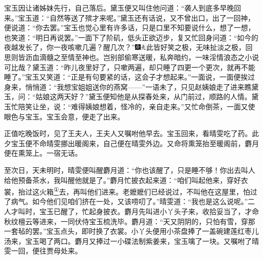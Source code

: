 宝玉因让诸姊妹先行，自己落后。黛玉便又叫住他问道：``袭人到底多早晚回来。''宝玉道：``自然等送了殡才来呢。''黛玉还有话说，又不曾出口，出了一回神，便说道：``你去罢。''宝玉也觉心里有许多话，只是口里不知要说什么，想了一想，也笑道：``明日再说罢。''一面下了阶矶，低头正欲迈步，复又忙回身问道：``如今的夜越发长了，你一夜咳嗽几遍？醒几次？''{\includegraphics[width=3mm]{../Images/00004}\includegraphics[width=3mm]{../Images/00012}\footnotesize \kaishu 此皆好笑之极，无味扯淡之极，回思则皆沥血滴髓之至情至神也。岂别部偷寒送暖，私奔暗约，一味淫情浪态之小说可比哉？}黛玉道：``昨儿夜里好了，只嗽两遍，却只睡了四更一个更次，就再不能睡了。''宝玉又笑道：``正是有句要紧的话，这会子才想起来。''一面说，一面便挨过身来，悄悄道：``我想宝姐姐送你的燕窝------''一语未了，只见赵姨娘走了进来瞧黛玉，问：``姑娘这两天好？''黛玉便知他是从探春处来，从门前过，顺路的人情。黛玉忙陪笑让坐，说：``难得姨娘想着，怪冷的，亲自走来。''又忙命倒茶，一面又使眼色与宝玉。宝玉会意，便走了出来。

正值吃晚饭时，见了王夫人，王夫人又嘱咐他早去。宝玉回来，看晴雯吃了药。此夕宝玉便不命晴雯挪出暖阁来，自己便在晴雯外边。又命将熏笼抬至暖阁前，麝月便在熏笼上。一宿无话。

至次日，天未明时，晴雯便叫醒麝月道：``你也该醒了，只是睡不够！你出去叫人给他预备茶水，我叫醒他就是了。''麝月忙披衣起来道：``咱们叫起他来，穿好衣裳，抬过这火箱\href{../Text/part0056_split_000.html\#lnkback_1_a}{\textsuperscript{①}}去，再叫他们进来。老嬷嬷们已经说过，不叫他在这屋里，怕过了病气。如今他们见咱们挤在一处，又该唠叨了。''晴雯道：``我也是这么说呢。''二人才叫时，宝玉已醒了，忙起身披衣。麝月先叫进小丫头子来，收拾妥当了，才命秋纹檀云等进来，一同伏侍宝玉梳洗毕。麝月道：``天又阴阴的，只怕有雪，穿那一套毡的罢。''宝玉点头，即时换了衣裳。小丫头便用小茶盘捧了一盖碗建莲红枣儿汤来，宝玉喝了两口。麝月又捧过一小碟法制紫姜来，宝玉噙了一块。又嘱咐了晴雯一回，便往贾母处来。

